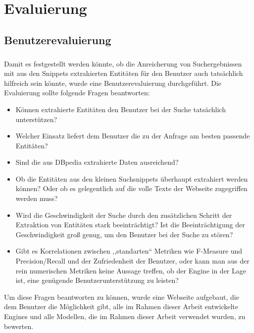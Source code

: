 \chapter{Evaluierung}

\section{Benutzerevaluierung}
\paragraph{}
Damit es festgestellt werden könnte, ob die Anreicherung von Suchergebnissen mit aus den Snippets extrahierten Entitäten für den Benutzer auch tatsächlich hilfreich sein könnte, wurde eine Benutzerevaluierung durchgeführt. Die Evaluierung sollte folgende Fragen beantworten:

\begin{itemize}
\item Können extrahierte Entitäten den Benutzer bei der Suche tatsächlich unterstützen?
\item Welcher Einsatz liefert dem Benutzer die zu der Anfrage am besten passende Entitäten?
\item Sind die aus DBpedia extrahierte Daten ausreichend?
\item Ob die Entitäten aus den kleinen Suchsnippets überhaupt extrahiert werden können? Oder ob es gelegentlich auf die volle Texte der Webseite zugegriffen werden muss?
\item Wird die Geschwindigkeit der Suche durch den zusätzlichen Schritt der Extraktion von Entitäten stark beeinträchtigt? Ist die Beeinträchtigung der Geschwindigkeit groß genug, um den Benutzer bei der Suche zu stören?
\item Gibt es Korrelationen zwischen ,,standarten`` Metriken wie F-Measure und Precision/Recall und der Zufriedenheit der Benutzer, oder kann man aus der rein numerischen Metriken keine Aussage treffen, ob der Engine in der Lage ist, eine genügende Benutzerunterstützung zu leisten?
\end{itemize}

Um diese Fragen beantworten zu können, wurde eine Webseite aufgebaut, die dem Benutzer die Möglichkeit gibt, alle im Rahmen dieser Arbeit entwickelte Engines und alle Modellen, die im Rahmen dieser Arbeit verwendet wurden, zu bewerten. 

